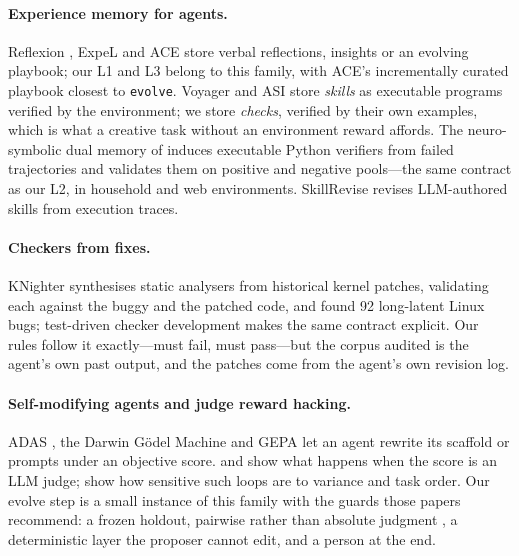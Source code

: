\documentclass[11pt]{article}
\begin{document}
\paragraph{Experience memory for agents.} Reflexion \citep{reflexion2023}, ExpeL \citep{expel2024}
and ACE \citep{ace2026} store verbal reflections, insights or an evolving playbook; our L1 and L3
belong to this family, with ACE's incrementally curated playbook closest to \texttt{evolve}. Voyager
\citep{voyager2023} and ASI \citep{asi2025} store \emph{skills} as executable programs verified by the
environment; we store \emph{checks}, verified by their own examples, which is what a creative task
without an environment reward affords. The neuro-symbolic dual memory of \citet{neurosymbolicmem2026}
induces executable Python verifiers from failed trajectories and validates them on positive and
negative pools---the same contract as our L2, in household and web environments. SkillRevise
\citep{skillrevise2026} revises LLM-authored skills from execution traces.

\paragraph{Checkers from fixes.} KNighter \citep{knighter2025} synthesises static analysers from
historical kernel patches, validating each against the buggy and the patched code, and found 92
long-latent Linux bugs; test-driven checker development \citep{codechecker2024} makes the same
contract explicit. Our rules follow it exactly---must fail, must pass---but the corpus audited is the
agent's own past output, and the patches come from the agent's own revision log.

\paragraph{Self-modifying agents and judge reward hacking.} ADAS \citep{adas2024}, the Darwin G\"odel
Machine \citep{dgm2025} and GEPA \citep{gepa2025} let an agent rewrite its scaffold or prompts under
an objective score. \citet{notanoracle2026} and \citet{moreconvincing2026} show what happens when the
score is an LLM judge; \citet{fragility2026} show how sensitive such loops are to variance and task
order. Our evolve step is a small instance of this family with the guards those papers recommend: a
frozen holdout, pairwise rather than absolute judgment \citep{mtbench2023}, a deterministic layer the
proposer cannot edit, and a person at the end.
\end{document}
